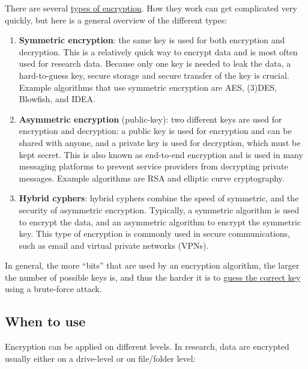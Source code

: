 \documentclass[
]{book}
\providecommand{\tightlist}{%
  \setlength{\itemsep}{0pt}\setlength{\parskip}{0pt}}
\begin{document}
There are several \href{https://en.wikipedia.org/wiki/Encryption\#Types}{types of encryption}.
How they work can get complicated very quickly, but here is a general overview
of the different types:

\begin{enumerate}
\def\labelenumi{\arabic{enumi}.}
\tightlist
\item
  \textbf{Symmetric encryption}: the same key is used for both encryption and
  decryption. This is a relatively quick way to encrypt data and is most often
  used for research data. Because only one key is needed to leak the data, a
  hard-to-guess key, secure storage and secure transfer of the key is crucial.
  Example algorithms that use symmetric encryption are AES, (3)DES, Blowfish, and
  IDEA.
\item
  \textbf{Asymmetric encryption} (public-key): two different keys are used for
  encryption and decryption: a public key is used for encryption and can be
  shared with anyone, and a private key is used for decryption, which must be
  kept secret. This is also known as end-to-end encryption and is used in many
  messaging platforms to prevent service providers from decrypting private
  messages. Example algorithms are RSA and elliptic curve cryptography.
\item
  \textbf{Hybrid cyphers}: hybrid cyphers combine the speed of symmetric, and the
  security of asymmetric encryption. Typically, a symmetric algorithm is used to
  encrypt the data, and an asymmetric algorithm to encrypt the symmetric key.
  This type of encryption is commonly used in secure communications, such as
  email and virtual private networks (VPNs).
\end{enumerate}

In general, the more ``bits'' that are used by an encryption algorithm, the
larger the number of possible keys is, and thus the harder it is to
\href{https://www.futurelearn.com/info/courses/encryption-and-cryptography/0/steps/184663}{guess the correct key}
using a brute-force attack.

\hypertarget{encryption-when}{%
\subsection{When to use}\label{encryption-when}}

Encryption can be applied on different levels. In research, data are encrypted
usually either on a drive-level or on file/folder level:
\end{document}

